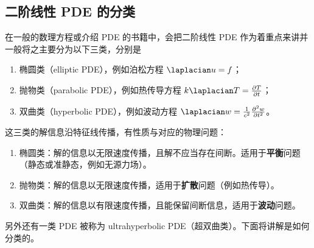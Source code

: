 \subsection{二阶线性 PDE 的分类}\label{sub_chacur_1}
在一般的数理方程或介绍 PDE 的书籍中，会把二阶线性 PDE 作为着重点来讲并一般将之主要分为以下三类，分别是
\begin{enumerate}
\item 椭圆类（elliptic PDE），例如泊松方程 $\laplacian u = f$；
\item 抛物类（parabolic PDE），例如热传导方程 $k \laplacian T = \frac{\partial T}{\partial t}$；
\item 双曲类（hyperbolic PDE），例如波动方程 $\laplacian w = \frac{1}{c^2} \frac{\partial^2 w}{\partial t^2}$。
\end{enumerate}
这三类的解信息沿特征线传播，有性质与对应的物理问题：
\begin{enumerate}
\item 椭圆类：解的信息以无限速度传播，且解不应当存在间断。适用于\textbf{平衡}问题（静态或准静态，例如无源力场）。
\item 抛物类：解的信息以无限速度传播，适用于\textbf{扩散}问题（例如热传导）。
\item 双曲类：解的信息以有限速度传播，且能保留间断信息，适用于\textbf{波动}问题。
\end{enumerate}
另外还有一类 PDE 被称为 ultrahyperbolic PDE（超双曲类）。下面将讲解是如何分类的。

